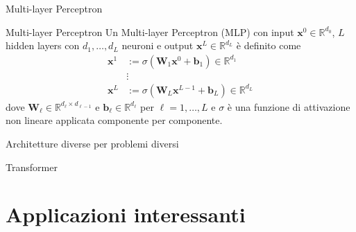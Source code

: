 \documentclass[aspectratio=169]{beamer}
\newcommand{\numberset}{\mathbb}
\newcommand{\R}{\numberset{R}}
\begin{document}
\begin{frame}{Multi-layer Perceptron}
 \begin{definition}{Multi-layer Perceptron}
  Un Multi-layer Perceptron (MLP) con input $\mathbf{x}^{0}\in \R^{d_{0}}$, $L$ hidden layers con $d_{1}, \ldots, d_{L}$ neuroni e output $\mathbf{x}^{L}\in \R^{d_{L}}$ è definito come
    \begin{align*}
     \mathbf{x}^{1} &:= \sigma\left( \mathbf{W}_{1} \mathbf{x}^{0} + \mathbf{b}_{1} \right) \in \R^{d_{1}} \\
     &\vdots \\
     \mathbf{x}^{L} &:= \sigma\left( \mathbf{W}_{L} \mathbf{x}^{L-1} + \mathbf{b}_{L} \right) \in \R^{d_{L}}
    \end{align*}
    dove $\mathbf{W}_{\ell}\in \R^{d_{\ell}\times d_{\ell-1}}$ e $\mathbf{b}_{\ell}\in \R^{d_{\ell}}$ per $\ell=1,\ldots, L$ e $\sigma$ è una funzione di attivazione non lineare applicata componente per componente.
 \end{definition}
\end{frame}

\begin{frame}{Architetture diverse per problemi diversi}

\end{frame}

\begin{frame}{Transformer}

\end{frame}

\section{Applicazioni interessanti}
\sectionpage
\end{document}
